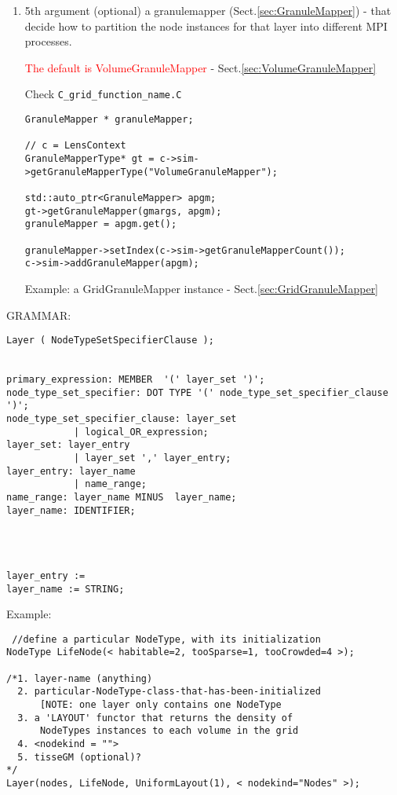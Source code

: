 \begin{enumerate}
  \item 5th argument (optional) a granulemapper (Sect.\ref{sec:GranuleMapper}) -
  that decide how to partition the node instances for that layer into different
  MPI processes.
  
  \textcolor{red}{The default is VolumeGranuleMapper} -
  Sect.\ref{sec:VolumeGranuleMapper}
  
Check \verb!C_grid_function_name.C!
\begin{verbatim}
GranuleMapper * granuleMapper;

// c = LensContext
GranuleMapperType* gt = c->sim->getGranuleMapperType("VolumeGranuleMapper");

std::auto_ptr<GranuleMapper> apgm;
gt->getGranuleMapper(gmargs, apgm);
granuleMapper = apgm.get();

granuleMapper->setIndex(c->sim->getGranuleMapperCount());
c->sim->addGranuleMapper(apgm);
\end{verbatim}  

  Example: a GridGranuleMapper instance - Sect.\ref{sec:GridGranuleMapper}
  
\end{enumerate}


% 
GRAMMAR:
\begin{verbatim}
Layer ( NodeTypeSetSpecifierClause );


primary_expression: MEMBER  '(' layer_set ')';
node_type_set_specifier: DOT TYPE '(' node_type_set_specifier_clause ')';
node_type_set_specifier_clause: layer_set
        	| logical_OR_expression;
layer_set: layer_entry
        	| layer_set ',' layer_entry;
layer_entry: layer_name
        	| name_range;
name_range: layer_name MINUS  layer_name;
layer_name: IDENTIFIER;




layer_entry :=
layer_name := STRING;
\end{verbatim}

Example:
\begin{verbatim}
 //define a particular NodeType, with its initialization  
NodeType LifeNode(< habitable=2, tooSparse=1, tooCrowded=4 >);

/*1. layer-name (anything)
  2. particular-NodeType-class-that-has-been-initialized 
      [NOTE: one layer only contains one NodeType
  3. a 'LAYOUT' functor that returns the density of 
      NodeTypes instances to each volume in the grid
  4. <nodekind = "">
  5. tisseGM (optional)? 
*/ 
Layer(nodes, LifeNode, UniformLayout(1), < nodekind="Nodes" >);
\end{verbatim}

